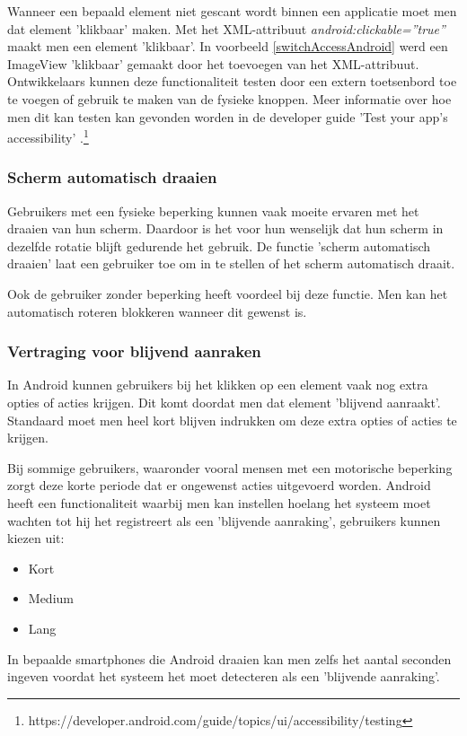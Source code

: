 Wanneer een bepaald element niet gescant wordt binnen een applicatie moet men dat element 'klikbaar' maken. Met het XML-attribuut \emph{android:clickable=''true''} maakt men een element 'klikbaar'. In voorbeeld \ref{switchAccessAndroid} werd een ImageView 'klikbaar' gemaakt door het toevoegen van het XML-attribuut.
\\
Ontwikkelaars kunnen deze functionaliteit testen door een extern toetsenbord toe te voegen of gebruik te maken van de fysieke knoppen. Meer informatie over hoe men dit kan testen kan gevonden worden in de developer guide 'Test your app's accessibility' .\footnote{https://developer.android.com/guide/topics/ui/accessibility/testing}
\subsubsection{Scherm automatisch draaien}
Gebruikers met een fysieke beperking kunnen vaak moeite ervaren met het draaien van hun scherm. Daardoor is het voor hun wenselijk dat hun scherm in dezelfde rotatie blijft gedurende het gebruik. De functie 'scherm automatisch draaien' laat een gebruiker toe om in te stellen of het scherm automatisch draait.

Ook de gebruiker zonder beperking heeft voordeel bij deze functie. Men kan het automatisch roteren blokkeren wanneer dit gewenst is.

\subsubsection{Vertraging voor blijvend aanraken}
\label{subsec:AndroidAangepast}
In Android kunnen gebruikers bij het klikken op een element vaak nog extra opties of acties krijgen. Dit komt doordat men dat element 'blijvend aanraakt'. Standaard moet men heel kort blijven indrukken om deze extra opties of acties te krijgen. 

Bij sommige gebruikers, waaronder vooral mensen met een motorische beperking zorgt deze korte periode dat er ongewenst acties uitgevoerd worden. Android heeft een functionaliteit waarbij men kan instellen hoelang het systeem moet wachten tot hij het registreert als een 'blijvende aanraking', gebruikers kunnen kiezen uit:
\begin{itemize}
    \item Kort
    \item Medium
    \item Lang
\end{itemize}
In bepaalde smartphones die Android draaien kan men zelfs het aantal seconden ingeven voordat het systeem het moet detecteren als een 'blijvende aanraking'. 
